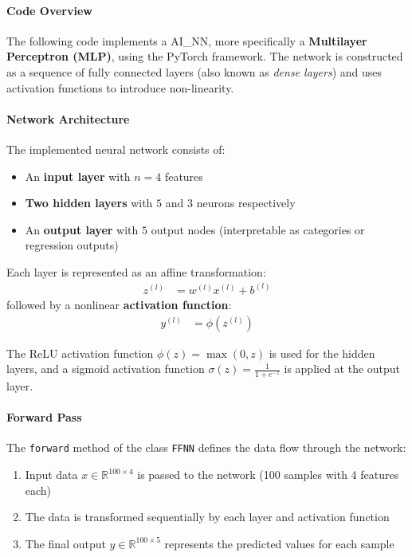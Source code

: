 \paragraph{Code Overview}
The following code implements a \gls{AI_NN}, more specifically a \textbf{Multilayer Perceptron (MLP)}, using the PyTorch framework. The network is constructed as a sequence of fully connected layers (also known as \textit{dense layers}) and uses activation functions to introduce non-linearity.

\paragraph{Network Architecture}
The implemented neural network consists of:
\begin{itemize}
	\item An \textbf{input layer} with $n=4$ features
	\item \textbf{Two hidden layers} with $5$ and $3$ neurons respectively
	\item An \textbf{output layer} with $5$ output nodes (interpretable as categories or regression outputs)
\end{itemize}

Each layer is represented as an affine transformation:
\begin{align}
	z^{(l)} &= w^{(l)} x^{(l)} + b^{(l)}
\end{align}
followed by a nonlinear \textbf{activation function}:
\begin{align}
	y^{(l)} &= \phi\left(z^{(l)}\right)
\end{align}

The ReLU activation function $\phi(z) = \max(0, z)$ is used for the hidden layers, and a sigmoid activation function $\sigma(z) = \frac{1}{1+e^{-z}}$ is applied at the output layer.

\paragraph{Forward Pass}
The \texttt{forward} method of the class \texttt{FFNN} defines the data flow through the network:
\begin{enumerate}
	\item Input data $x \in \mathbb{R}^{100 \times 4}$ is passed to the network (100 samples with 4 features each)
	\item The data is transformed sequentially by each layer and activation function
	\item The final output $y \in \mathbb{R}^{100 \times 5}$ represents the predicted values for each sample
\end{enumerate}


